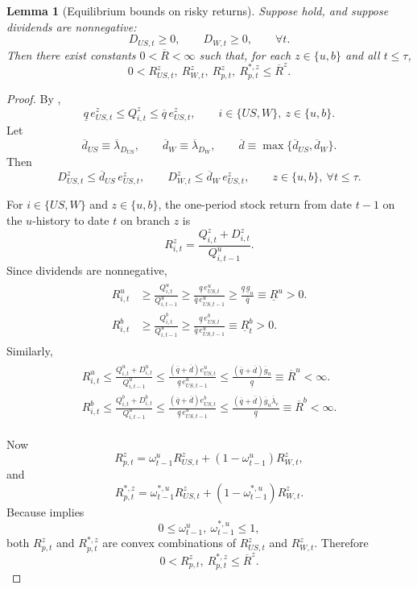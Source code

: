 \documentclass[12pt]{article}
\theoremstyle{plain}
\newtheorem{lem}{Lemma}
\begin{document}
\begin{lem}[Equilibrium bounds on risky returns]\label{lem_risky_return_bounds}
Suppose
hold, and suppose dividends are nonnegative:
\[
D_{US,t}\ge 0,
\qquad
D_{W,t}\ge 0,
\qquad \forall t.
\]
Then there exist constants $0< \overline R<\infty$ such that, for each
$z\in\{u,b\}$ and all $t\le\tau$,
\[
0
<
R_{US,t}^z,\ R_{W,t}^z,\ R_{p,t}^z,\ R_{p,t}^{*,z}
\le
\overline R^z.
\]
\end{lem}

\begin{proof}
By ,
\[
\underline q\,e_{US,t}^z
\le
Q_{i,t}^z
\le
\overline q\,e_{US,t}^z,
\qquad
i\in\{US,W\},\ z\in\{u,b\}.
\]
Let
\[
\overline d_{US}\equiv \overline\lambda_{D_{US}},
\qquad
\overline d_W\equiv \overline\lambda_{D_W},
\qquad
\overline d\equiv \max\{\overline d_{US},\overline d_W\}.
\]
Then
\[
D_{US,t}^z\le \overline d_{US}\,e_{US,t}^z,
\qquad
D_{W,t}^z\le \overline d_W\,e_{US,t}^z,
\qquad
z\in\{u,b\},\ \forall t\le\tau.
\]

For $i\in\{US,W\}$ and $z\in\{u,b\}$, the one-period stock return from date $t-1$ on the $u$-history to
date $t$ on branch $z$ is
\[
R_{i,t}^z=\frac{Q_{i,t}^z+D_{i,t}^z}{Q_{i,t-1}^u}.
\]
Since dividends are nonnegative,
\begin{align*}
\begin{split}
R_{i,t}^u
& \ge
\frac{Q_{i,t}^u}{Q_{i,t-1}^u}
\ge
\frac{\underline q\,e_{US,t}^u}{\overline q\,e_{US,t-1}^u}
\ge
\frac{\underline q\,\underline g_u}{\overline q}
\equiv
\underline R^u
>0.
\\
R_{i,t}^b
& \ge
\frac{Q_{i,t}^b}{Q_{i,t-1}^u}
\ge
\frac{\underline q\,e_{US,t}^b}{\overline q\,e_{US,t-1}^u}
\equiv
\underline R^b_t
>0.
\end{split}
\end{align*}
Similarly,
\begin{align*}
\begin{split}
R_{i,t}^u
\le
\frac{Q_{i,t}^u+D_{i,t}^u}{Q_{i,t-1}^u}
\le
\frac{(\overline q+\overline d)e_{US,t}^u}{\underline q\,e_{US,t-1}^u}
\le
\frac{(\overline q+\overline d)\overline g_u }{\underline q}
\equiv
\overline R^u
<\infty.
\\
R_{i,t}^b
\le
\frac{Q_{i,t}^b+D_{i,t}^b}{Q_{i,t-1}^u}
\le
\frac{(\overline q+\overline d)e_{US,t}^b}{\underline q\,e_{US,t-1}^u}
\le
\frac{(\overline q+\overline d)\overline g_u \overline \lambda_e}{\underline q}
\equiv
\overline R^b
<\infty.
\end{split}
\end{align*}

Now
\[
R_{p,t}^z
=
\omega_{t-1}^u R_{US,t}^z+(1-\omega_{t-1}^u)R_{W,t}^z,
\]
and
\[
R_{p,t}^{*,z}
=
\omega_{t-1}^{*,u} R_{US,t}^z+(1-\omega_{t-1}^{*,u})R_{W,t}^z.
\]
Because  implies
\[
0\le \omega_{t-1}^u,\ \omega_{t-1}^{*,u}\le 1,
\]
both $R_{p,t}^z$ and $R_{p,t}^{*,z}$ are convex combinations of
$R_{US,t}^z$ and $R_{W,t}^z$. Therefore
\[
0
<
R_{p,t}^z,\ R_{p,t}^{*,z}
\le
\overline R^z.
\]
\end{proof}
\end{document}
